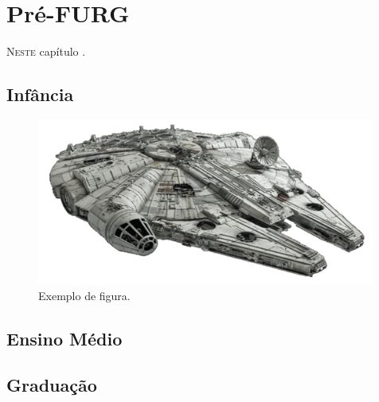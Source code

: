 \chapter{Pré-FURG}

\lettrine[lines=2, lhang=0.33, loversize=0.25, findent=1.5em]{N}{este} capítulo \lipsum[8].


\section{Infância}

\lipsum[10]

\lipsum[11]

\lipsum[12]


\begin{figure}
	\centering
		\includegraphics[width=0.99\textwidth,angle=-0]{Figuras/starwars_1.pdf}
		\caption[Linha do tempo pré FURG]{{\footnotesize Exemplo de figura.}}
		\label{fig:gantt}
\end{figure}

\section{Ensino Médio}
\lipsum[13] 

\lipsum[14]

\lipsum[15]

\lipsum[16]



\section{Graduação}

\lipsum[17]

\lipsum[18]

\lipsum[19]